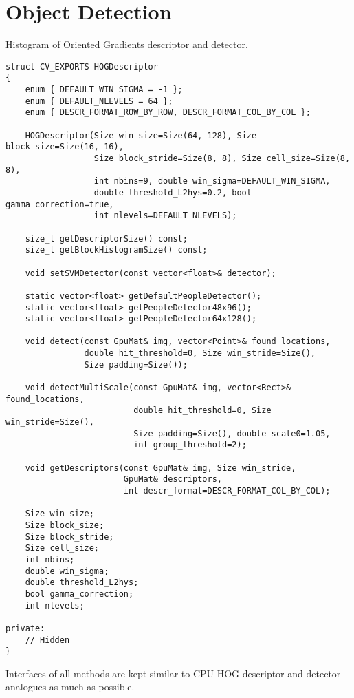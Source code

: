 \section{Object Detection}


Histogram of Oriented Gradients descriptor and detector.

\begin{lstlisting}
struct CV_EXPORTS HOGDescriptor
{
    enum { DEFAULT_WIN_SIGMA = -1 };
    enum { DEFAULT_NLEVELS = 64 };
    enum { DESCR_FORMAT_ROW_BY_ROW, DESCR_FORMAT_COL_BY_COL };

    HOGDescriptor(Size win_size=Size(64, 128), Size block_size=Size(16, 16),
                  Size block_stride=Size(8, 8), Size cell_size=Size(8, 8),
                  int nbins=9, double win_sigma=DEFAULT_WIN_SIGMA,
                  double threshold_L2hys=0.2, bool gamma_correction=true,
                  int nlevels=DEFAULT_NLEVELS);

    size_t getDescriptorSize() const;
    size_t getBlockHistogramSize() const;

    void setSVMDetector(const vector<float>& detector);

    static vector<float> getDefaultPeopleDetector();
    static vector<float> getPeopleDetector48x96();
    static vector<float> getPeopleDetector64x128();

    void detect(const GpuMat& img, vector<Point>& found_locations, 
                double hit_threshold=0, Size win_stride=Size(), 
                Size padding=Size());

    void detectMultiScale(const GpuMat& img, vector<Rect>& found_locations,
                          double hit_threshold=0, Size win_stride=Size(), 
                          Size padding=Size(), double scale0=1.05, 
                          int group_threshold=2);

    void getDescriptors(const GpuMat& img, Size win_stride, 
                        GpuMat& descriptors,
                        int descr_format=DESCR_FORMAT_COL_BY_COL);

    Size win_size;
    Size block_size;
    Size block_stride;
    Size cell_size;
    int nbins;
    double win_sigma;
    double threshold_L2hys;
    bool gamma_correction;
    int nlevels;

private:
    // Hidden
}
\end{lstlisting}

Interfaces of all methods are kept similar to CPU HOG descriptor and detector analogues as much as possible.


